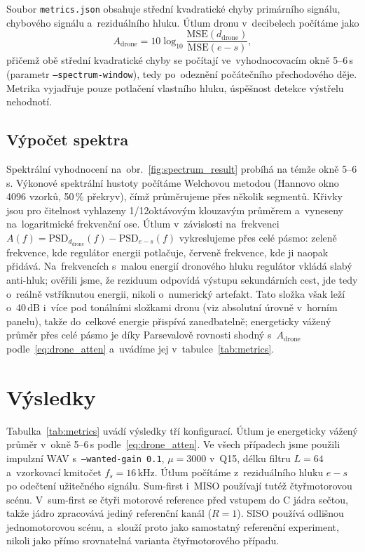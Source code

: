 \documentclass[conference]{IEEEtran}
\newcommand{\code}[1]{\texttt{#1}}
\begin{document}
Soubor \code{metrics.json} obsahuje střední kvadratické chyby primárního signálu, chybového signálu a~reziduálního hluku. Útlum dronu v~decibelech počítáme jako
\begin{equation}
  A_{\mathrm{drone}} = 10\log_{10}\frac{\mathrm{MSE}(d_{\mathrm{drone}})}{\mathrm{MSE}(e-s)},
  \label{eq:drone_atten}
\end{equation}
přičemž obě střední kvadratické chyby se počítají ve~vyhodnocovacím okně 5--6\,s (parametr \code{--spectrum-window}), tedy po~odeznění počátečního přechodového děje. Metrika vyjadřuje pouze potlačení vlastního hluku, úspěšnost detekce výstřelu nehodnotí.

\subsection{Výpočet spektra}
Spektrální vyhodnocení na~obr.~\ref{fig:spectrum_result} probíhá na témže okně 5--6\,s. Výkonové spektrální hustoty počítáme Welchovou metodou (Hannovo okno 4096 vzorků, 50\,\% překryv), čímž průměrujeme přes několik segmentů. Křivky jsou pro čitelnost vyhlazeny 1/12oktávovým klouzavým průměrem a~vyneseny na~logaritmické frekvenční ose. Útlum v~závislosti na~frekvenci $A(f)=\mathrm{PSD}_{d_{\mathrm{drone}}}(f)-\mathrm{PSD}_{e-s}(f)$ vykreslujeme přes celé pásmo: zeleně frekvence, kde regulátor energii potlačuje, červeně frekvence, kde ji naopak přidává. Na~frekvencích s~malou energií dronového hluku regulátor vkládá slabý anti-hluk; ověřili jsme, že reziduum odpovídá výstupu sekundárních cest, jde tedy o~reálně vstříknutou energii, nikoli o~numerický artefakt. Tato složka však leží o~40\,dB i~více pod tonálními složkami dronu (viz absolutní úrovně v~horním panelu), takže do~celkové energie přispívá zanedbatelně; energeticky vážený průměr přes celé pásmo je díky Parsevalově rovnosti shodný s~$A_{\mathrm{drone}}$ podle~\eqref{eq:drone_atten} a~uvádíme jej v~tabulce~\ref{tab:metrics}.

\section{Výsledky}
Tabulka~\ref{tab:metrics} uvádí výsledky tří konfigurací. Útlum je energeticky vážený průměr v~okně 5--6\,s podle~\eqref{eq:drone_atten}. Ve všech případech jsme použili impulzní WAV s~\code{--wanted-gain 0.1}, $\mu=3000$ v~Q15, délku filtru $L=64$ a~vzorkovací kmitočet $f_s=16$\,kHz. Útlum počítáme z~reziduálního hluku $e-s$ po odečtení užitečného signálu. Sum-first i~MISO používají tutéž čtyřmotorovou scénu. V~sum-first se čtyři motorové reference před vstupem do C jádra sečtou, takže jádro zpracovává jediný referenční kanál ($R=1$). SISO používá odlišnou jednomotorovou scénu, a~slouží proto jako samostatný referenční experiment, nikoli jako přímo srovnatelná varianta čtyřmotorového případu.
\end{document}
